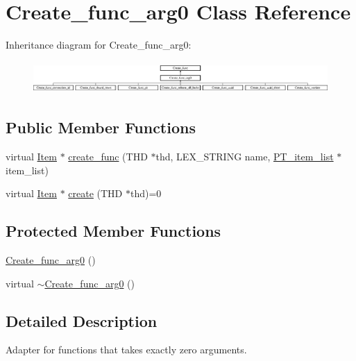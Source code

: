 \hypertarget{classCreate__func__arg0}{}\section{Create\+\_\+func\+\_\+arg0 Class Reference}
\label{classCreate__func__arg0}
Inheritance diagram for Create\+\_\+func\+\_\+arg0\+:\begin{figure}[H]
\begin{center}
\leavevmode
\includegraphics[height=1.230769cm]{classCreate__func__arg0}
\end{center}
\end{figure}
\subsection*{Public Member Functions}
\begin{DoxyCompactItemize}
\item 
virtual \mbox{\hyperlink{classItem}{Item}} $\ast$ \mbox{\hyperlink{classCreate__func__arg0_a79ec91336e8f6276501fbc1bc6c30e5e}{create\+\_\+func}} (T\+HD $\ast$thd, L\+E\+X\+\_\+\+S\+T\+R\+I\+NG name, \mbox{\hyperlink{classPT__item__list}{P\+T\+\_\+item\+\_\+list}} $\ast$item\+\_\+list)
\item 
virtual \mbox{\hyperlink{classItem}{Item}} $\ast$ \mbox{\hyperlink{classCreate__func__arg0_abb65b43817f9382759c79487228ee29f}{create}} (T\+HD $\ast$thd)=0
\end{DoxyCompactItemize}
\subsection*{Protected Member Functions}
\begin{DoxyCompactItemize}
\item 
\mbox{\hyperlink{classCreate__func__arg0_a55c0e7053db4162f496c310d24b393e7}{Create\+\_\+func\+\_\+arg0}} ()
\item 
virtual \mbox{\hyperlink{classCreate__func__arg0_afba062710aa8462cb4213f7d02e76940}{$\sim$\+Create\+\_\+func\+\_\+arg0}} ()
\end{DoxyCompactItemize}


\subsection{Detailed Description}
Adapter for functions that takes exactly zero arguments. 

